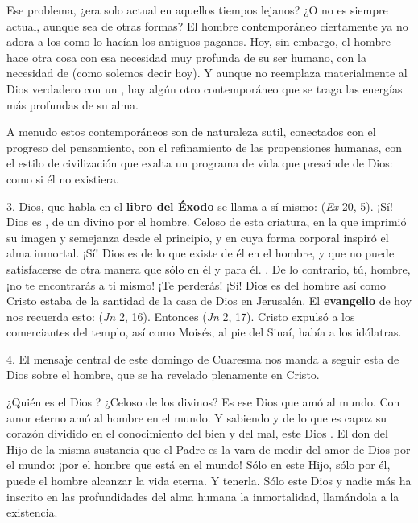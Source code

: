 \begin{body}
Ese problema, ¿era solo actual en aquellos tiempos lejanos? ¿O no es siempre actual, aunque sea de otras formas? El hombre contemporáneo ciertamente ya no adora a los  como lo hacían los antiguos paganos. Hoy, sin embargo, el hombre hace otra cosa con esa necesidad muy profunda de su ser humano, con la necesidad de  (como solemos decir hoy). Y aunque no reemplaza materialmente al Dios verdadero con un , hay algún otro  contemporáneo que se traga las energías más profundas de su alma.

A menudo estos  contemporáneos son de naturaleza sutil, conectados con el progreso del pensamiento, con el refinamiento de las propensiones humanas, con el estilo de civilización que exalta un programa de vida que prescinde de Dios: como si él no existiera.

3. Dios, que habla en el \textbf{libro del Éxodo} se llama a sí mismo:  (\textit{Ex} 20, 5). ¡Sí! Dios es , de un  divino por el hombre. Celoso de esta criatura, en la que imprimió su imagen y semejanza desde el principio, y en cuya forma corporal inspiró el alma inmortal. ¡Sí! Dios es  de lo que existe de él en el hombre, y que no puede satisfacerse de otra manera que sólo en él y para él. . De lo contrario, tú, hombre, ¡no te encontrarás a ti mismo! ¡Te perderás! ¡Sí! Dios es  del hombre así como Cristo estaba  de la santidad de la casa de Dios en Jerusalén. El \textbf{evangelio} de hoy nos recuerda esto:  (\textit{Jn} 2, 16). Entonces  (\textit{Jn} 2, 17). Cristo expulsó a los comerciantes del templo, así como Moisés, al pie del Sinaí, había  a los idólatras.

4. El mensaje central de este domingo de Cuaresma nos manda a seguir esta  de Dios sobre el hombre, que se ha revelado plenamente en Cristo.

¿Quién es el Dios ? ¿Celoso de los  divinos? Es ese Dios que amó al mundo. Con amor eterno amó al hombre en el mundo. Y sabiendo  y de lo que es capaz su corazón dividido en el conocimiento del bien y del mal, este Dios . El don del Hijo de la misma sustancia que el Padre es la vara de medir del amor de Dios por el mundo: ¡por el hombre que está en el mundo! Sólo en este Hijo, sólo por él, puede el hombre alcanzar la vida eterna. Y tenerla. Sólo este Dios y nadie más ha inscrito en las profundidades del alma humana la inmortalidad, llamándola a la existencia.


\end{body}
